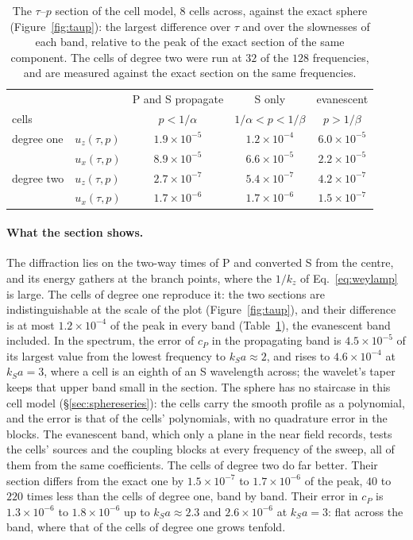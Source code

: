 \documentclass[11pt,a4paper]{article}
\begin{document}
\begin{table}[h]
\centering
\small
\begin{tabular}{llccc}
\toprule
 & & P and S propagate & S only & evanescent \\
cells & & $p<1/\alpha$ & $1/\alpha<p<1/\beta$ & $p>1/\beta$ \\
\midrule
degree one & $u_z(\tau,p)$ & $1.9\times10^{-5}$ & $1.2\times10^{-4}$ & $6.0\times10^{-5}$ \\
           & $u_x(\tau,p)$ & $8.9\times10^{-5}$ & $6.6\times10^{-5}$ & $2.2\times10^{-5}$ \\
\midrule
degree two & $u_z(\tau,p)$ & $2.7\times10^{-7}$ & $5.4\times10^{-7}$ & $4.2\times10^{-7}$ \\
           & $u_x(\tau,p)$ & $1.7\times10^{-6}$ & $1.7\times10^{-6}$ & $1.5\times10^{-7}$ \\
\bottomrule
\end{tabular}
\caption{The $\tau$--$p$ section of the cell model, $8$ cells across, against the exact sphere
(Figure~\ref{fig:taup}): the largest difference over $\tau$ and over the slownesses of each band, relative to the
peak of the exact section of the same component. The cells of degree two were run at $32$ of the
$128$ frequencies, and are measured against the exact section on the same frequencies.}
\label{tab:taup}
\end{table}

\paragraph{What the section shows.} The diffraction lies on the two-way times of P and converted S from the
centre, and its energy gathers at the branch points, where the $1/k_z$ of Eq.~\eqref{eq:weylamp} is large. The
cells of degree one reproduce it: the two sections are indistinguishable at the scale of the plot
(Figure~\ref{fig:taup}), and their difference is at most $1.2\times10^{-4}$ of the peak in every band
(Table~\ref{tab:taup}), the evanescent band included. In the spectrum, the error of $c_P$ in the propagating
band is $4.5\times10^{-5}$ of its largest value from the lowest frequency to $k_Sa\approx2$, and rises to
$4.6\times10^{-4}$ at $k_Sa=3$, where a cell is an eighth of an S wavelength across; the wavelet's taper keeps
that upper band small in the section. The sphere has no staircase in this cell model
(\S\ref{sec:sphereseries}): the cells carry the smooth profile as a polynomial, and the error is that of the
cells' polynomials, with no quadrature error in the blocks. The evanescent band, which only a plane in the
near field records, tests the cells' sources and the coupling blocks at every frequency of the sweep, all of
them from the same coefficients. The cells of degree two do far better. Their section differs from the exact one by $1.5\times10^{-7}$ to
$1.7\times10^{-6}$ of the peak, $40$ to $220$ times less than the cells of degree one, band by band. Their
error in $c_P$ is $1.3\times10^{-6}$ to $1.8\times10^{-6}$ up to $k_Sa\approx2.3$ and $2.6\times10^{-6}$ at
$k_Sa=3$: flat across the band, where that of the cells of degree one grows tenfold.
\end{document}
